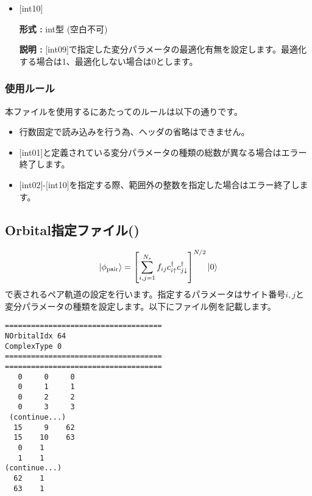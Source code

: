 \begin{itemize}
 \item  $[$int10$]$
   
   {\bf 形式 :} int型 (空白不可)

  {\bf 説明 :} [int09]で指定した変分パラメータの最適化有無を設定します。最適化する場合は1、最適化しない場合は0とします。
  
\end{itemize}

\subsubsection{使用ルール}
本ファイルを使用するにあたってのルールは以下の通りです。
\begin{itemize}
\item 行数固定で読み込みを行う為、ヘッダの省略はできません。
\item $[$int01$]$と定義されている変分パラメータの種類の総数が異なる場合はエラー終了します。
\item $[$int02$]$-$[$int10$]$を指定する際、範囲外の整数を指定した場合はエラー終了します。
\end{itemize}

\newpage
\subsection{Orbital指定ファイル()}
\label{Subsec:Orbital}

\begin{equation}
|\phi_{\rm pair} \rangle = \left[\sum_{i, j=1}^{N_s} f_{ij}c_{i\uparrow}^{\dag}c_{j\downarrow}^{\dag} \right]^{N/2}|0 \rangle
\end{equation}
で表されるペア軌道の設定を行います。指定するパラメータはサイト番号$i, j$と変分パラメータの種類を設定します。以下にファイル例を記載します。

\begin{minipage}{12.5cm}
\begin{screen}
\begin{verbatim}
====================================
NOrbitalIdx 64   
ComplexType 0
====================================
====================================
   0     0     0 
   0     1     1 
   0     2     2 
   0     3     3 
 (continue...)
  15     9    62 
  15    10    63 
   0    1 
   1    1 
(continue...)
  62    1 
  63    1 
\end{verbatim}
\end{screen}
\end{minipage}

